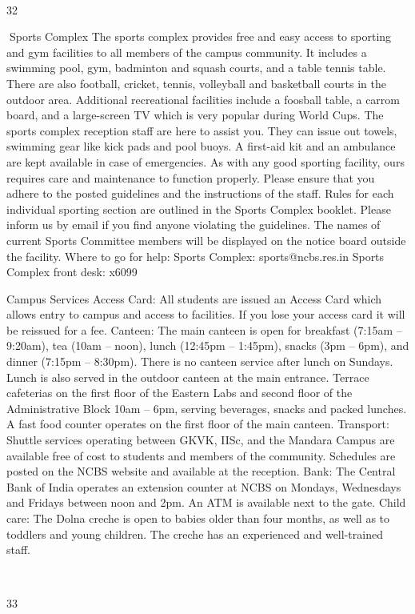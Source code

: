 \documentclass[a4paper,10pt]{article}
\begin{document}
	
  

32	
  

Sports Complex
The sports complex provides free and easy access to sporting and gym facilities to all
members of the campus community. It includes a swimming pool, gym, badminton and
squash courts, and a table tennis table. There are also football, cricket, tennis, volleyball and
basketball courts in the outdoor area. Additional recreational facilities include a foosball
table, a carrom board, and a large-screen TV which is very popular during World Cups. The
sports complex reception staff are here to assist you. They can issue out towels, swimming
gear like kick pads and pool buoys. A first-aid kit and an ambulance are kept available in
case of emergencies. As with any good sporting facility, ours requires care and maintenance
to function properly. Please ensure that you adhere to the posted guidelines and the
instructions of the staff. Rules for each individual sporting section are outlined in the Sports
Complex booklet. Please inform us by email if you find anyone violating the guidelines. The
names of current Sports Committee members will be displayed on the notice board outside
the facility.
Where to go for help:
Sports Complex: sports@ncbs.res.in
Sports Complex front desk: x6099

Campus Services
Access Card: All students are issued an Access Card which allows entry to campus and
access to facilities. If you lose your access card it will be reissued for a fee.
Canteen: The main canteen is open for breakfast (7:15am – 9:20am), tea (10am – noon),
lunch (12:45pm – 1:45pm), snacks (3pm – 6pm), and dinner (7:15pm – 8:30pm). There is no
canteen service after lunch on Sundays. Lunch is also served in the outdoor canteen at the
main entrance. Terrace cafeterias on the first floor of the Eastern Labs and second floor of
the Administrative Block 10am – 6pm, serving beverages, snacks and packed lunches. A
fast food counter operates on the first floor of the main canteen.
Transport: Shuttle services operating between GKVK, IISc, and the Mandara Campus are
available free of cost to students and members of the community. Schedules are posted on
the NCBS website and available at the reception.
Bank: The Central Bank of India operates an extension counter at NCBS on Mondays,
Wednesdays and Fridays between noon and 2pm. An ATM is available next to the gate.
Child care: The Dolna creche is open to babies older than four months, as well as to
toddlers and young children. The creche has an experienced and well-trained staff.

	
  

33	
  
\end{document}
